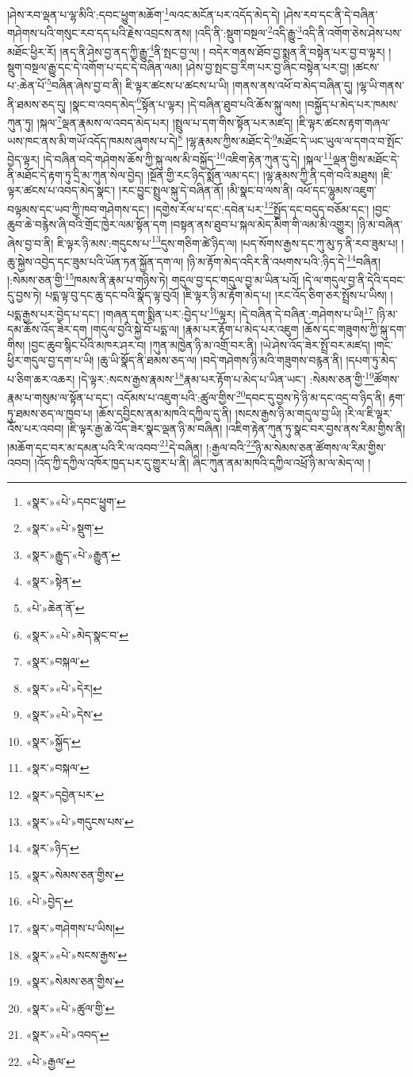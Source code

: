 །ཤེས་རབ་ལྡན་པ་ལྷ་མིའི་:དབང་ཕྱུག་མཆོག་\footnote{«སྣར་»«པེ་»དབང་ཕྱུག་}ལའང་མངོན་པར་འདོད་མེད་དེ། །ཤེས་རབ་དང་ནི་དེ་བཞིན་གཤེགས་པའི་གསུང་རབ་དད་པའི་རྗེས་འབྲངས་ནས། །འདི་ནི་:སྡུག་བསྔལ་\footnote{«སྣར་»«པེ་»སྡུག་}འདི་རྒྱུ་\footnote{«སྣར་»རྒྱུད་«པེ་»རྒྱུན་}འདི་ནི་འགོག་ཅེས་ཤེས་པས་མཐོང་ཕྱིར་རོ། །ནད་ནི་ཤེས་བྱ་ནད་ཀྱི་རྒྱུ་\footnote{«སྣར་»སྟེན་}ནི་སྤང་བྱ་ལ། །
བདེར་གནས་ཐོབ་བྱ་སྨན་ནི་བསྟེན་པར་བྱ་བ་ལྟར། །སྡུག་བསྔལ་རྒྱུ་དང་དེ་འགོག་པ་དང་དེ་བཞིན་ལམ། །ཤེས་བྱ་སྤང་བྱ་རིག་པར་བྱ་ཞིང་བསྟེན་པར་བྱ། །ཚངས་པ་:ཆེན་པོ་\footnote{«པེ་»ཆེན་ནོ་}བཞིན་ཞེས་བྱ་བ་ནི། ཇི་ལྟར་ཚངས་པ་ཚངས་པ་ཡི། །གནས་ནས་འཕོ་བ་མེད་བཞིན་དུ། །ལྷ་ཡི་གནས་ནི་ཐམས་ཅད་དུ། །སྣང་བ་འབད་མེད་\footnote{«སྣར་»«པེ་»མེད་སྣང་བ་}སྟོན་པ་ལྟར། །དེ་བཞིན་ཐུབ་པའི་ཆོས་སྐུ་ལས། །བསྐྱོད་པ་མེད་པར་ཁམས་ཀུན་ཏུ། །སྐལ་\footnote{«སྣར་»བསྐལ་}ལྡན་རྣམས་ལ་འབད་མེད་པར། །སྤྲུལ་པ་དག་གིས་སྟོན་པར་མཛད། །ཇི་ལྟར་ཚངས་རྟག་གཞལ་ཡས་ཁང་ནས་མི་གཡོ་འདོད་ཁམས་ཞུགས་པ་དེ།\footnote{«སྣར་»«པེ་»དེར།} །ལྷ་རྣམས་ཀྱིས་མཐོང་དེ་\footnote{«སྣར་»«པེ་»དེས་}མཐོང་དེ་ཡང་ཡུལ་ལ་དགའ་བ་སྤོང་བྱེད་ལྟར། །དེ་བཞིན་བདེ་གཤེགས་ཆོས་ཀྱི་སྐུ་ལས་མི་བསྐྱོད་\footnote{«སྣར་»སྐྱོད་}འཇིག་རྟེན་ཀུན་དུ་དེ། །སྐལ་\footnote{«སྣར་»བསྐལ་}ལྡན་གྱིས་མཐོང་དེ་ནི་མཐོང་དེ་རྟག་ཏུ་དྲི་མ་ཀུན་སེལ་བྱེད། །སྔོན་གྱི་རང་ཉིད་སྨོན་ལམ་དང་། །ལྷ་རྣམས་ཀྱི་ནི་དགེ་བའི་མཐུས། །ཇི་ལྟར་ཚངས་པ་འབད་མེད་སྣང་། །རང་བྱུང་སྤྲུལ་སྐུ་དེ་བཞིན་ནོ། །མི་སྣང་བ་ལས་ནི། འཕོ་དང་ལྷུམས་འཇུག་བལྟམས་དང་ཡབ་ཀྱི་ཁབ་གཤེགས་དང་། །དགྱེས་རོལ་པ་དང་:དབེན་པར་\footnote{«སྣར་»དབྱེན་པར་}སྤྱོད་དང་བདུད་བཅོམ་དང་། །བྱང་ཆུབ་ཆེ་བརྙེས་ཞི་བའི་གྲོང་ཁྱེར་ལམ་སྟོན་དག །བསྟན་ནས་ཐུབ་པ་སྐལ་མེད་མིག་གི་ལམ་མི་འགྱུར། །ཉི་མ་བཞིན་ཞེས་བྱ་བ་ནི། ཇི་ལྟར་ཉི་མས་:གདུངས་པ་\footnote{«སྣར་»«པེ་»གདུངས་པས་}དུས་གཅིག་ཚེ་ཉིད་ལ། །པད་སོགས་རྒྱས་དང་ཀུ་མུ་ཏ་ནི་རབ་ཟུམ་པ། །ཆུ་སྐྱེས་འབྱེད་དང་ཟུམ་པའི་ཡོན་ཏན་སྐྱོན་དག་ལ། །ཉི་མ་རྟོག་མེད་འདིར་ནི་འཕགས་པའི་:ཉིད་དེ་\footnote{«སྣར་»ཉིད་}བཞིན། །:སེམས་ཅན་གྱི་\footnote{«སྣར་»སེམས་ཅན་གྱིས་}ཁམས་ནི་རྣམ་པ་གཉིས་ཏེ། གདུལ་བྱ་དང་གདུལ་བྱ་མ་ཡིན་པའོ། །དེ་ལ་གདུལ་བྱ་ནི་དེའི་དབང་དུ་བྱས་ཏེ། པདྨ་ལྟ་བུ་དང་ཆུ་དང་བའི་སྣོད་ལྟ་བུའོ། །ཇི་ལྟར་ཉི་མ་རྟོག་མེད་པ། །རང་འོད་ཅིག་ཅར་སྤྲོས་པ་ཡིས། །པདྨ་རྒྱས་པར་བྱེད་པ་དང་། །གཞན་དག་སྨིན་པར་:བྱེད་པ་\footnote{«པེ་»བྱེད་}ལྟར། །དེ་བཞིན་དེ་བཞིན་:གཤེགས་པ་ཡི།\footnote{«སྣར་»གཤེགས་པ་ཡིས།} །ཉི་མ་དམ་ཆོས་འོད་ཟེར་དག །གདུལ་བྱའི་སྐྱེ་བོ་པདྨ་ལ། །རྣམ་པར་རྟོག་པ་མེད་པར་འཇུག །ཆོས་དང་གཟུགས་ཀྱི་སྐུ་དག་གིས། །བྱང་ཆུབ་སྙིང་པོའི་མཁར་ཤར་བ། །ཀུན་མཁྱེན་ཉི་མ་འགྲོ་བར་ནི། །ཡེ་ཤེས་འོད་ཟེར་སྤྲོ་བར་མཛད། །གང་ཕྱིར་གདུལ་བྱ་དག་པ་ཡི། །ཆུ་ཡི་སྣོད་ནི་ཐམས་ཅད་ལ། །བདེ་གཤེགས་ཉི་མའི་གཟུགས་བརྙན་ནི། །དཔག་ཏུ་མེད་པ་ཅིག་ཆར་འཆར། །དེ་ལྟར་:སངས་རྒྱས་རྣམས་\footnote{«སྣར་»«པེ་»སངས་རྒྱས་}རྣམ་པར་རྟོག་པ་མེད་པ་ཡིན་ཡང་། :སེམས་ཅན་གྱི་\footnote{«སྣར་»སེམས་ཅན་གྱིས་}ཚོགས་རྣམ་པ་གསུམ་ལ་སྟོན་པ་དང་། འདོམས་པ་འཇུག་པའི་:ཚུལ་གྱིས་\footnote{«སྣར་»«པེ་»ཚུལ་གྱི་}དབང་དུ་བྱས་ཏེ་ཉི་མ་དང་འདྲ་བ་ཉིད་ནི། རྟག་ཏུ་ཐམས་ཅད་ལ་ཁྱབ་པ། །ཆོས་དབྱིངས་ནམ་མཁའི་དཀྱིལ་དུ་ནི། །སངས་རྒྱས་ཉི་མ་གདུལ་བྱ་ཡི། །རི་ལ་ཇི་ལྟར་འོས་པར་འབབ། །ཇི་ལྟར་རྒྱ་ཆེ་འོད་ཟེར་སྣང་ལྡན་ཉི་མ་བཞིན། །འཇིག་རྟེན་ཀུན་ཏུ་སྣང་བར་བྱས་ནས་རིམ་གྱིས་ནི། །མཆོག་དང་བར་མ་དམན་པའི་རི་ལ་འབབ་\footnote{«སྣར་»«པེ་»འབད་}དེ་བཞིན། །:རྒྱལ་བའི་\footnote{«པེ་»རྒྱལ་}ཉི་མ་སེམས་ཅན་ཚོགས་ལ་རིམ་གྱིས་འབབ། །འོད་ཀྱི་དཀྱིལ་འཁོར་ཁྱད་པར་དུ་གྱུར་པ་ནི། ཞིང་ཀུན་ནམ་མཁའི་དཀྱིལ་འཕྲོ་ཉི་མ་ལ་མེད་ལ། །

